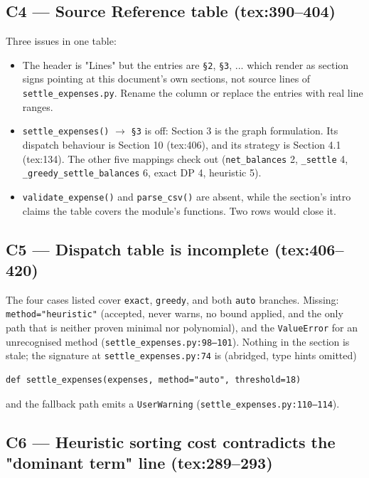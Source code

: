 \documentclass[11pt]{article}
\begin{document}
\subsection{C4 --- Source Reference table (tex:390--404)}

Three issues in one table:

\begin{itemize}
  \item The header is "Lines" but the entries are \texttt{\S2}, \texttt{\S3}, ... which render as section
signs pointing at this document's own sections, not source lines of \texttt{settle\_expenses.py}. Rename
the column or replace the entries with real line ranges.
  \item \texttt{settle\_expenses()} $\to$ \texttt{\S3} is off: Section 3 is the graph formulation. Its
dispatch behaviour is Section 10 (tex:406), and its strategy is Section 4.1 (tex:134). The other five
mappings check out (\texttt{net\_balances} 2, \texttt{\_settle} 4, \texttt{\_greedy\_settle\_balances} 6,
exact DP 4, heuristic 5).
  \item \texttt{validate\_expense()} and \texttt{parse\_csv()} are absent, while the section's intro claims
the table covers the module's functions. Two rows would close it.
\end{itemize}

\subsection{C5 --- Dispatch table is incomplete (tex:406--420)}

The four cases listed cover \texttt{exact}, \texttt{greedy}, and both \texttt{auto} branches. Missing:
\texttt{method="heuristic"} (accepted, never warns, no bound applied, and the only path that is neither
proven minimal nor polynomial), and the \texttt{ValueError} for an unrecognised method
(\texttt{settle\_expenses.py:98--101}). Nothing in the section is stale; the signature at
\texttt{settle\_expenses.py:74} is (abridged, type hints omitted)

\begin{verbatim}
def settle_expenses(expenses, method="auto", threshold=18)
\end{verbatim}

and the fallback path emits a \texttt{UserWarning} (\texttt{settle\_expenses.py:110--114}).

\subsection{C6 --- Heuristic sorting cost contradicts the "dominant term" line (tex:289--293)}
\end{document}

